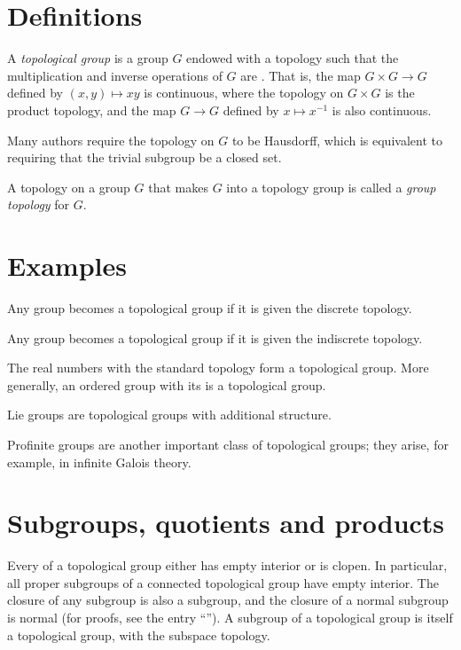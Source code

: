 \documentclass[12pt]{article}
\begin{document}

\section*{Definitions}

A \emph{topological group} is a group $G$ endowed with a topology
such that the multiplication and inverse operations of $G$
are .
That is, the map $G\times G\to G$ defined by $(x,y)\mapsto xy$ is continuous,
where the topology on $G\times G$ is the product topology,
and the map $G\to G$ defined by $x\mapsto x^{-1}$ is also continuous.

Many authors require the topology on $G$ to be Hausdorff,
which is equivalent to requiring that the trivial subgroup be a closed set.

A topology on a group $G$ that makes $G$ into a topology group
is called a \emph{group topology} for $G$.

\section*{Examples}

Any group becomes a topological group if it is given the discrete topology.

Any group becomes a topological group if it is given the indiscrete topology.

The real numbers with the standard topology form a topological group.
More generally, an ordered group with its 
is a topological group.

Lie groups are topological groups with additional structure.

Profinite groups are another important class of topological groups;
they arise, for example, in infinite Galois theory.

\section*{Subgroups, quotients and products}

Every  of a topological group
either has empty interior or is clopen.
In particular, all proper subgroups of a connected topological group
have empty interior.
The closure of any subgroup is also a subgroup,
and the closure of a normal subgroup is normal
(for proofs, see the entry
``'').
A subgroup of a topological group is itself a topological group,
with the subspace topology.
\end{document}
